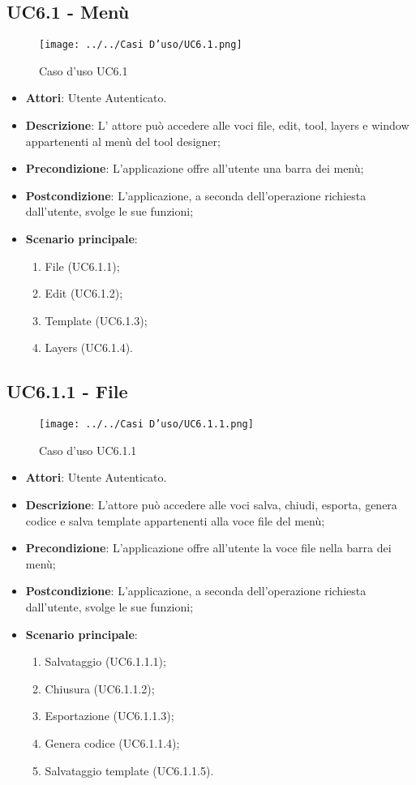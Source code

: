 \subsection{UC6.1 - Menù} 
\label{ssec:UC6.1} 
\begin{figure}[h!] 
\centering 
\texttt{[image: ../../Casi D'uso/UC6.1.png]} 
\caption{Caso d'uso UC6.1} 
 \end{figure} 
\begin{itemize} 
\item \textbf{Attori}: Utente Autenticato.
\item \textbf{Descrizione}: L’ attore può accedere alle voci file, edit, tool,
layers e window appartenenti al menù del tool designer;
\item \textbf{Precondizione}: L’applicazione offre all’utente una barra dei menù;
\item \textbf{Postcondizione}: L’applicazione, a seconda dell’operazione richiesta dall’utente,
svolge le sue funzioni;
\item \textbf{Scenario principale}: \begin{enumerate}\item File (UC6.1.1);\item Edit (UC6.1.2);\item Template (UC6.1.3);\item Layers (UC6.1.4). 
 \end{enumerate}
\end{itemize} 
\subsection{UC6.1.1 - File} 
\label{ssec:UC6.1.1} 
\begin{figure}[h!] 
\centering 
\texttt{[image: ../../Casi D'uso/UC6.1.1.png]} 
\caption{Caso d'uso UC6.1.1} 
 \end{figure} 
\begin{itemize} 
\item \textbf{Attori}: Utente Autenticato.
\item \textbf{Descrizione}: L’attore può accedere alle voci salva, chiudi, esporta, genera codice e salva template appartenenti alla voce file del menù;
\item \textbf{Precondizione}: L’applicazione offre all’utente la voce file nella barra dei menù;
\item \textbf{Postcondizione}: L’applicazione, a seconda dell’operazione richiesta dall’utente,
svolge le sue funzioni;
\item \textbf{Scenario principale}: \begin{enumerate}\item Salvataggio (UC6.1.1.1);\item Chiusura (UC6.1.1.2);\item Esportazione (UC6.1.1.3);\item Genera codice (UC6.1.1.4);\item Salvataggio template (UC6.1.1.5). 
 \end{enumerate}
\end{itemize} 
